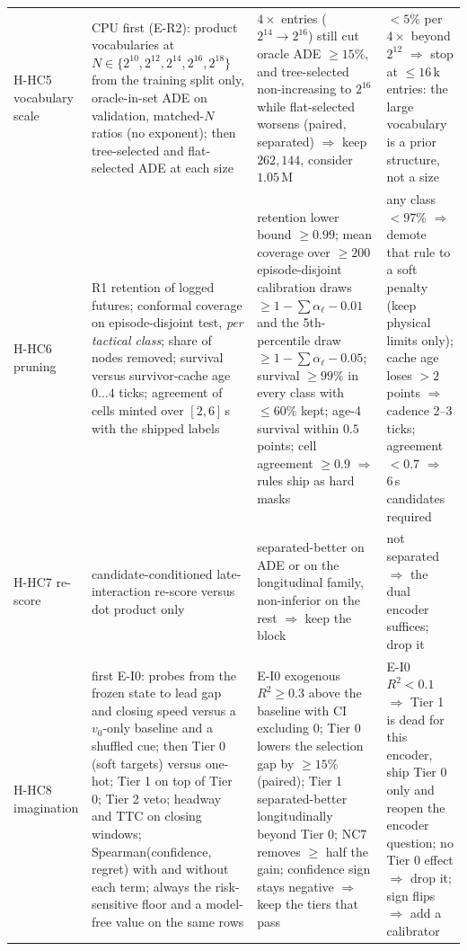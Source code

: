 \begin{longtable}{@{}p{1.3cm}p{3.8cm}p{5.3cm}p{4.9cm}@{}}
H-HC5 vocabulary scale & CPU first (E-R2): product vocabularies at $N\in\{2^{10},2^{12},2^{14},2^{16},2^{18}\}$ from the training split only, oracle-in-set ADE on validation, matched-$N$ ratios (no exponent); then tree-selected and flat-selected ADE at each size & $4\times$ entries ($2^{14}\to2^{16}$) still cut oracle ADE $\ge15\%$, and tree-selected non-increasing to $2^{16}$ while flat-selected worsens (paired, separated) $\Rightarrow$ keep $262{,}144$, consider $1.05$\,M & $<5\%$ per $4\times$ beyond $2^{12}$ $\Rightarrow$ stop at $\le16$\,k entries: the large vocabulary is a prior structure, not a size \\
H-HC6 pruning & R1 retention of logged futures; conformal coverage on episode-disjoint test, \emph{per tactical class}; share of nodes removed; survival versus survivor-cache age $0\ldots4$ ticks; agreement of cells minted over $[2,6]$\,s with the shipped labels & retention lower bound $\ge0.99$; mean coverage over $\ge200$ episode-disjoint calibration draws $\ge1-\sum\alpha_\ell-0.01$ and the 5th-percentile draw $\ge1-\sum\alpha_\ell-0.05$; survival $\ge99\%$ in every class with $\le60\%$ kept; age-4 survival within $0.5$ points; cell agreement $\ge0.9$ $\Rightarrow$ rules ship as hard masks & any class $<97\%$ $\Rightarrow$ demote that rule to a soft penalty (keep physical limits only); cache age loses $>2$ points $\Rightarrow$ cadence 2--3 ticks; agreement $<0.7$ $\Rightarrow$ 6\,s candidates required \\
H-HC7 re-score & candidate-conditioned late-interaction re-score versus dot product only & separated-better on ADE or on the longitudinal family, non-inferior on the rest $\Rightarrow$ keep the block & not separated $\Rightarrow$ the dual encoder suffices; drop it \\
H-HC8 imagination & first E-I0: probes from the frozen state to lead gap and closing speed versus a $v_0$-only baseline and a shuffled cue; then Tier 0 (soft targets) versus one-hot; Tier 1 on top of Tier 0; Tier 2 veto; headway and TTC on closing windows; Spearman(confidence, regret) with and without each term; always the risk-sensitive floor and a model-free value on the same rows & E-I0 exogenous $R^2\ge0.3$ above the baseline with CI excluding 0; Tier 0 lowers the selection gap by $\ge15\%$ (paired); Tier 1 separated-better longitudinally beyond Tier 0; NC7 removes $\ge$ half the gain; confidence sign stays negative $\Rightarrow$ keep the tiers that pass & E-I0 $R^2<0.1$ $\Rightarrow$ Tier 1 is dead for this encoder, ship Tier 0 only and reopen the encoder question; no Tier 0 effect $\Rightarrow$ drop it; sign flips $\Rightarrow$ add a calibrator \\

\end{longtable}
